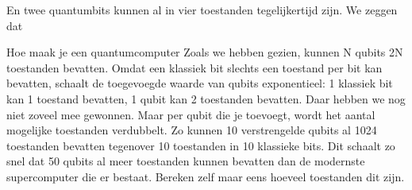 \documentclass[../../main.tex]{subfiles}
\begin{document}
En twee quantumbits kunnen al in vier toestanden tegelijkertijd zijn. We zeggen dat 


Hoe maak je een quantumcomputer 
Zoals we hebben gezien, kunnen N qubits 2N toestanden bevatten. Omdat een klassiek bit slechts een toestand per bit kan bevatten, schaalt de toegevoegde waarde van qubits exponentieel: 1 klassiek bit kan 1 toestand bevatten, 1 qubit kan 2 toestanden bevatten. Daar hebben we nog niet zoveel mee gewonnen. Maar per qubit die je toevoegt, wordt het aantal mogelijke toestanden verdubbelt. Zo kunnen 10 verstrengelde qubits al 1024 toestanden bevatten tegenover 10 toestanden in 10 klassieke bits. Dit schaalt zo snel dat 50 qubits al meer toestanden kunnen bevatten dan de modernste supercomputer die er bestaat. Bereken zelf maar eens hoeveel toestanden dit zijn. 
\fi%
\end{document}
